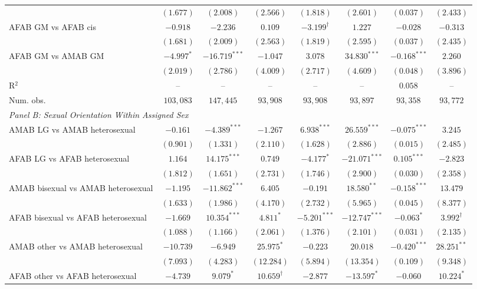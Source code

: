 \begin{table}[htpb!]
{\begin{tabular}{l c c c c c c c}
 & $(1.677)$ & $(2.008)$ & $(2.566)$ & $(1.818)$ & $(2.601)$ & $(0.037)$ & $(2.433)$ \\
AFAB GM vs AFAB cis & $-0.918$ & $-2.236$ & $0.109$ & $-3.199^{\dagger}$ & $1.227$ & $-0.028$ & $-0.313$ \\
 & $(1.681)$ & $(2.009)$ & $(2.563)$ & $(1.819)$ & $(2.595)$ & $(0.037)$ & $(2.435)$ \\
AFAB GM vs AMAB GM & $-4.997^{*}$ & $-16.719^{***}$ & $-1.047$ & $3.078$ & $34.830^{***}$ & $-0.168^{***}$ & $2.260$ \\
 & $(2.019)$ & $(2.786)$ & $(4.009)$ & $(2.717)$ & $(4.609)$ & $(0.048)$ & $(3.896)$ \\
\hline
R$^2$ & -- & -- & -- & -- & -- & $0.058$ & -- \\
Num. obs. & $103,083$ & $147,445$ & $93,908$ & $93,908$ & $93,897$ & $93,358$ & $93,772$ \\
\hline
\multicolumn{8}{l}{\textit{Panel B: Sexual Orientation Within Assigned Sex}} \\
AMAB LG vs AMAB heterosexual & $-0.161$ & $-4.389^{***}$ & $-1.267$ & $6.938^{***}$ & $26.559^{***}$ & $-0.075^{***}$ & $3.245$ \\
 & $(0.901)$ & $(1.331)$ & $(2.110)$ & $(1.628)$ & $(2.886)$ & $(0.015)$ & $(2.485)$ \\
AFAB LG vs AFAB heterosexual & $1.164$ & $14.175^{***}$ & $0.749$ & $-4.177^{*}$ & $-21.071^{***}$ & $0.105^{***}$ & $-2.823$ \\
 & $(1.812)$ & $(1.651)$ & $(2.731)$ & $(1.746)$ & $(2.900)$ & $(0.030)$ & $(2.358)$ \\
AMAB bisexual vs AMAB heterosexual & $-1.195$ & $-11.862^{***}$ & $6.405$ & $-0.191$ & $18.580^{**}$ & $-0.158^{***}$ & $13.479$ \\
 & $(1.633)$ & $(1.986)$ & $(4.170)$ & $(2.732)$ & $(5.965)$ & $(0.045)$ & $(8.377)$ \\
AFAB bisexual vs AFAB heterosexual & $-1.669$ & $10.354^{***}$ & $4.811^{*}$ & $-5.201^{***}$ & $-12.747^{***}$ & $-0.063^{*}$ & $3.992^{\dagger}$ \\
 & $(1.088)$ & $(1.166)$ & $(2.061)$ & $(1.376)$ & $(2.101)$ & $(0.031)$ & $(2.135)$ \\
AMAB other vs AMAB heterosexual & $-10.739$ & $-6.949$ & $25.975^{*}$ & $-0.223$ & $20.018$ & $-0.420^{***}$ & $28.251^{**}$ \\
 & $(7.093)$ & $(4.283)$ & $(12.284)$ & $(5.894)$ & $(13.354)$ & $(0.109)$ & $(9.348)$ \\
AFAB other vs AFAB heterosexual & $-4.739$ & $9.079^{*}$ & $10.659^{\dagger}$ & $-2.877$ & $-13.597^{*}$ & $-0.060$ & $10.224^{*}$ \\

\end{tabular}}
\end{table}
